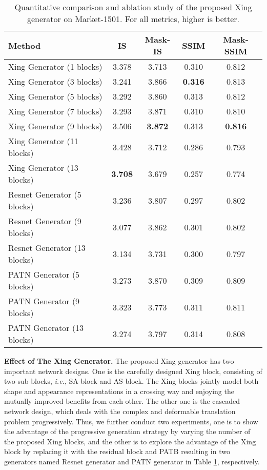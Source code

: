 \documentclass[runningheads]{llncs}
\begin{document}
\begin{table}[!t]
	\centering
	\caption{Quantitative comparison and ablation study of the proposed Xing generator on Market-1501. For all metrics, higher is better. }
		\begin{tabular}{lcccc} \toprule
			Method                      & IS    & Mask-IS & SSIM   & Mask-SSIM    \\ \hline
			Xing Generator (1 blocks) & 3.378 & 3.713   & 0.310  & 0.812 \\
			Xing Generator (3 blocks)  & 3.241 & 3.866   & \textbf{0.316}  & 0.813 \\
			Xing Generator (5 blocks)   & 3.292 & 3.860     & 0.313  & 0.812 \\ 
			Xing Generator (7 blocks)   & 3.293 & 3.871     & 0.310  & 0.810 \\
			Xing Generator (9 blocks) & 3.506 & \textbf{3.872}     & 0.313  & \textbf{0.816}  \\
			Xing Generator (11 blocks)  & 3.428 & 3.712     & 0.286  & 0.793 \\
			Xing Generator (13 blocks)  & \textbf{3.708}    & 3.679     & 0.257  & 0.774 \\ \hline
			Resnet Generator (5 blocks) & 3.236 & 3.807     & 0.297  & 0.802 \\
			Resnet Generator (9 blocks) & 3.077 & 3.862     & 0.301 &  0.802 \\
			Resnet Generator (13 blocks)& 3.134 &  3.731    & 0.300 & 0.797 \\ \hline
			PATN Generator (5 blocks)   & 3.273 & 3.870     & 0.309 &  0.809 \\
			PATN Generator (9 blocks)   &  3.323 & 3.773    & 0.311 & 0.811 \\
			PATN Generator (13 blocks)  & 3.274 & 3.797     & 0.314 & 0.808 \\ 
			\bottomrule	
	\end{tabular}
	\label{tab:ablation_blocks}
\end{table}

\noindent \textbf{Effect of The Xing Generator.}
The proposed Xing generator has two important network designs. 
One is the carefully designed Xing block, consisting of two sub-blocks, \emph{i.e.}, SA block and AS block. 
The Xing blocks jointly model both shape and appearance representations in a crossing way and enjoying the mutually improved benefits from each other.
The other one is the cascaded network design, which deals with the complex and deformable translation problem progressively.
Thus, we further conduct two experiments, one is to show the advantage of the progressive generation strategy by varying the number of the proposed Xing blocks, and the other is to explore the advantage of the Xing block by replacing it with the residual block \cite{johnson2016perceptual} and PATB \cite{zhu2019progressive} resulting in two generators named Resnet generator and PATN generator in Table \ref{tab:ablation_blocks}, respectively.
\end{document}
